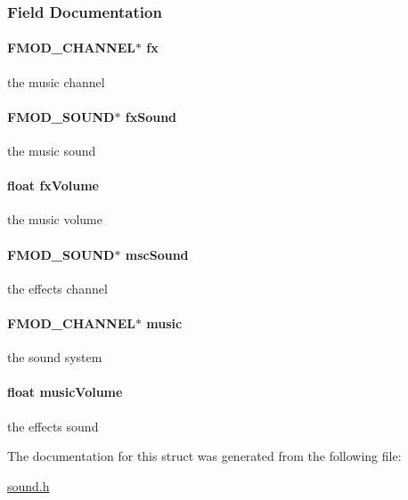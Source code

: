 \subsubsection{Field Documentation}
\hypertarget{struct_sound_a259d72174e26b5bb58146484cd54c1c8}{
\paragraph[{fx}]{\setlength{\rightskip}{0pt plus 5cm}F\-M\-O\-D\-\_\-\-C\-H\-A\-N\-N\-E\-L$\ast$ fx}}\label{struct_sound_a259d72174e26b5bb58146484cd54c1c8}
the music channel \hypertarget{struct_sound_a38b0d95773369da732eb81a289b52940}{
\paragraph[{fx\-Sound}]{\setlength{\rightskip}{0pt plus 5cm}F\-M\-O\-D\-\_\-\-S\-O\-U\-N\-D$\ast$ fx\-Sound}}\label{struct_sound_a38b0d95773369da732eb81a289b52940}
the music sound \hypertarget{struct_sound_aedb4246a8bbae1c53f2f29572674b054}{
\paragraph[{fx\-Volume}]{\setlength{\rightskip}{0pt plus 5cm}float fx\-Volume}}\label{struct_sound_aedb4246a8bbae1c53f2f29572674b054}
the music volume \hypertarget{struct_sound_a1051e4654836160d314f8d49fe85ae77}{
\paragraph[{msc\-Sound}]{\setlength{\rightskip}{0pt plus 5cm}F\-M\-O\-D\-\_\-\-S\-O\-U\-N\-D$\ast$ msc\-Sound}}\label{struct_sound_a1051e4654836160d314f8d49fe85ae77}
the effects channel \hypertarget{struct_sound_acca26c408c6140c8cdc0d8f49d31ad4a}{
\paragraph[{music}]{\setlength{\rightskip}{0pt plus 5cm}F\-M\-O\-D\-\_\-\-C\-H\-A\-N\-N\-E\-L$\ast$ music}}\label{struct_sound_acca26c408c6140c8cdc0d8f49d31ad4a}
the sound system \hypertarget{struct_sound_a6f06b572245c72c79f052b7efb89dc3b}{
\paragraph[{music\-Volume}]{\setlength{\rightskip}{0pt plus 5cm}float music\-Volume}}\label{struct_sound_a6f06b572245c72c79f052b7efb89dc3b}
the effects sound 

The documentation for this struct was generated from the following file\-:\begin{DoxyCompactItemize}
\item 
\hyperlink{sound_8h}{sound.\-h}\end{DoxyCompactItemize}
